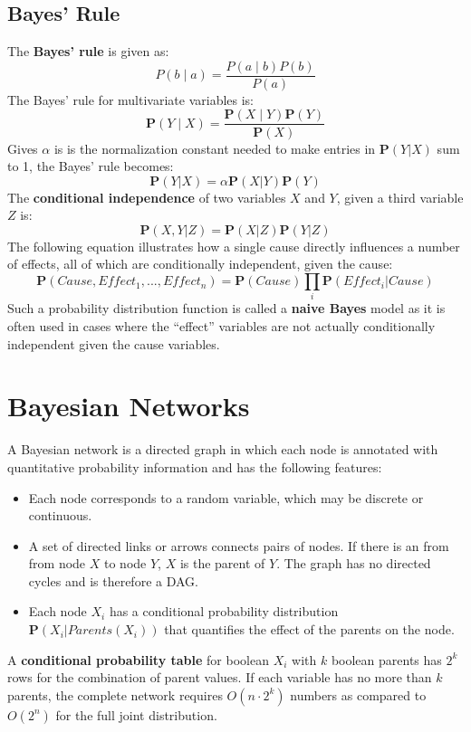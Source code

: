 \documentclass[twoside]{article}
\begin{document}
\subsection{Bayes' Rule}
The \textbf{Bayes' rule} is given as:
\begin{equation}
        P(b \mid a) = \frac{P(a \mid b)P(b)}{P(a)}
\end{equation}
The Bayes' rule for multivariate variables is:
\begin{equation}
        \mathbf P(Y \mid X) = \frac{\mathbf P(X \mid Y) \mathbf P(Y)}{\mathbf P(X)}
\end{equation}
Gives \(\alpha\) is is the normalization constant needed to make entries in 
\(\mathbf P(Y|X)\) sum to 1, the Bayes' rule becomes:
\begin{equation}
        \mathbf P(Y|X) = \alpha \mathbf P(X|Y) \mathbf P(Y)
\end{equation}
The \textbf{conditional independence} of two variables \(X\) and \(Y\), given 
a third variable \(Z\) is:
\begin{equation}
        \mathbf P(X,Y|Z) = \mathbf P(X|Z) \mathbf P(Y|Z)
\end{equation}
The following equation illustrates how a single cause directly influences a 
number of effects, all of which are conditionally 
independent, given the cause:
\begin{equation}
        \mathbf P(Cause, Effect_1,...,Effect_n) = \mathbf P(Cause) \prod _i \mathbf P(Effect_i|Cause)
\end{equation}
Such a probability distribution function is called a \textbf{naive Bayes} 
model as it is often used in cases where the ``effect'' variables are not 
actually conditionally independent given the cause variables.
\section{Bayesian Networks}
A Bayesian network is a directed graph in which each node is annotated with 
quantitative probability information and has the following features:
\begin{itemize}
        \item Each node corresponds to a random variable, which may be discrete 
        or continuous.
        \item A set of directed links or arrows connects pairs of nodes. If 
        there is an from from node \(X\) to node \(Y\), \(X\) is the parent of 
        \(Y\). The graph has no directed cycles and is therefore a DAG.
        \item Each node \(X_i\) has a conditional probability distribution \(\mathbf P(X_i|Parents(X_i))\)
        that quantifies the effect of the parents on the node.
\end{itemize}
A \textbf{conditional probability table} for boolean \(X_i\) with \(k\) boolean 
parents has \(2^k\) rows for the combination of parent values. If each variable
has no more than \(k\) parents, the complete network requires \(O(n\cdot 2^k)\)
numbers as compared to \(O(2^n)\) for the full joint distribution.
\end{document}
